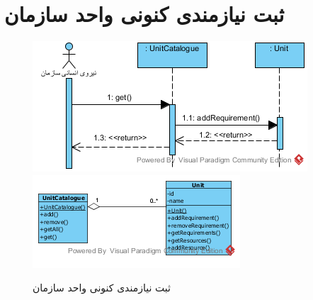 \section{ثبت نیازمندی کنونی واحد سازمان}
\begin{figure}[H]
	\centering
	\includegraphics[scale=0.7]{img/sequence-analysis/AddRequirementToUnit}
	\includegraphics[scale=0.7]{img/sequence-analysis/AddRequirementToUnitC}
	\caption{ثبت نیازمندی کنونی واحد سازمان}
\end{figure}

